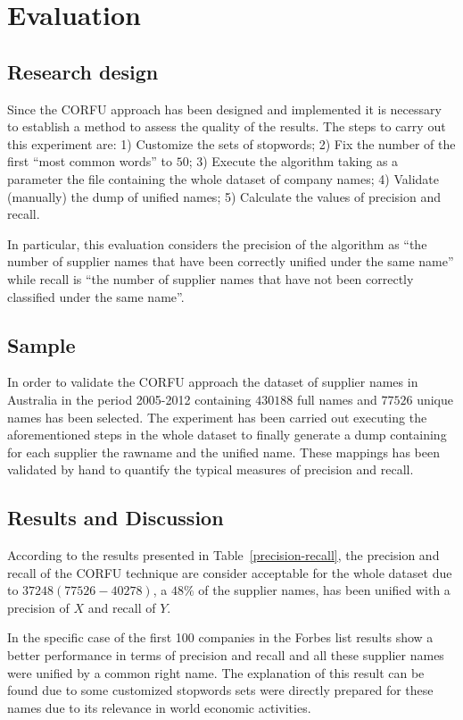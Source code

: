 \documentclass{llncs}
\begin{document}
\section{Evaluation}

\subsection{Research design}
Since the CORFU approach has been designed and implemented it is necessary to 
establish a method to assess the quality of the results. The steps to carry 
out this experiment are: 1) Customize the sets of stopwords; 2) Fix the number 
of the first ``most common words'' to $50$; 3) Execute the algorithm taking 
as a parameter the file containing the whole dataset of company names; 4) 
Validate (manually) the dump of unified names; 5) Calculate the values of 
precision and recall.   

In particular, this evaluation considers the precision of the algorithm as ``the number of supplier 
names that have been correctly unified under the same name'' while recall is 
``the number of supplier names that have not been correctly classified under the same name''. 

\subsection{Sample}
In order to validate the CORFU approach the dataset of supplier names in Australia 
in the period 2005-2012 containing $430188$ full names 
and $77526$ unique names has been selected. The experiment has been 
carried out executing the aforementioned steps in the whole dataset 
to finally generate a dump containing for each supplier the 
rawname and the unified name. These mappings has been validated 
by hand to quantify the typical measures of precision and recall. 

\subsection{Results and Discussion}
According to the results presented in Table~\ref{precision-recall}, the precision 
and recall of the CORFU technique are consider acceptable for the whole dataset 
due to $37248 (77526-40278)$, a $48\%$ of the supplier names, has been unified with 
a precision of $X$ and recall of $Y$.

In the specific case of the first 100 companies in the Forbes list results show a better 
performance in terms of precision and recall and all these supplier names 
were unified by a common right name. The explanation of this result 
can be found due to some customized stopwords sets were directly prepared for 
these names due to its relevance in world economic activities.
\end{document}
